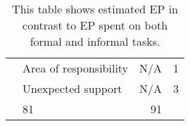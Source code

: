 \begin{table}[h]
\begin{tabular}{llrr}
        &Area of responsibility                                        & N/A          & 1            \\
        &Unexpected support                                            & N/A          & 3            \\
        \tblgrpsep
        \midrule
        \multicolumn{2}{l}{Total}                                                         & 81           & 91           \\
    \end{tabular}
    \caption{This table shows estimated EP in contrast to EP spent on both formal and informal tasks.}\label{tab:sprint1tasktable}
\end{table}